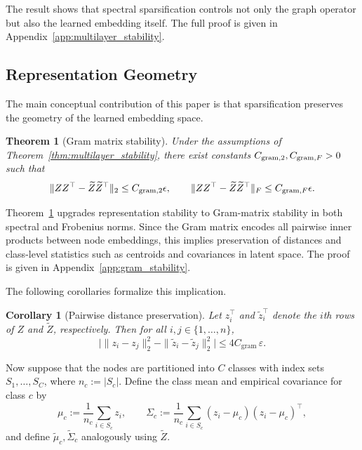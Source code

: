 \documentclass{article}
\newtheorem{theorem}{Theorem}
\newtheorem{corollary}{Corollary}
\begin{document}
The result shows that spectral sparsification controls not only the graph operator but also the learned embedding itself. The full proof is given in Appendix~\ref{app:multilayer_stability}.

\subsection{Representation Geometry}

The main conceptual contribution of this paper is that sparsification preserves the geometry of the learned embedding space.
\begin{theorem}[Gram matrix stability]
\label{thm:gram_stability}
Under the assumptions of Theorem~\ref{thm:multilayer_stability}, there exist constants
$C_{{\rm gram},2},C_{{\rm gram},F}>0$ such that
\[
\|ZZ^\top-\widetilde Z\widetilde Z^\top\|_2
\le C_{{\rm gram},2}\epsilon,
\qquad
\|ZZ^\top-\widetilde Z\widetilde Z^\top\|_F
\le C_{{\rm gram},F}\epsilon .
\]
\end{theorem}


Theorem~\ref{thm:gram_stability} upgrades representation stability to Gram-matrix stability in both spectral and Frobenius norms. Since the Gram matrix encodes all pairwise inner products between node embeddings, this implies preservation of distances and class-level statistics such as centroids and covariances in latent space. The proof is given in Appendix~\ref{app:gram_stability}.

The following corollaries formalize this implication.

\begin{corollary}[Pairwise distance preservation]
\label{cor:distance_preservation}
Let $z_i^\top$ and $\widetilde z_i^\top$ denote the $i$th rows of $Z$ and $\widetilde Z$, respectively. Then for all $i,j \in \{1,\dots,n\}$,
\begin{equation}
\bigl|
\|z_i-z_j\|_2^2 - \|\widetilde z_i-\widetilde z_j\|_2^2
\bigr|
\le 4 C_{\mathrm{gram}}\,\varepsilon.
\label{eq:distance_preservation}
\end{equation}
\end{corollary}

Now suppose that the nodes are partitioned into $C$ classes with index sets $S_1,\dots,S_C$, where $n_c := |S_c|$. Define the class mean and empirical covariance for class $c$ by
\begin{equation}
\mu_c := \frac{1}{n_c}\sum_{i\in S_c} z_i, \qquad
\Sigma_c := \frac{1}{n_c}\sum_{i\in S_c}(z_i-\mu_c)(z_i-\mu_c)^\top,
\label{eq:class_cov}
\end{equation}
and define $\widetilde\mu_c,\widetilde\Sigma_c$ analogously using $\widetilde Z$.
\end{document}
